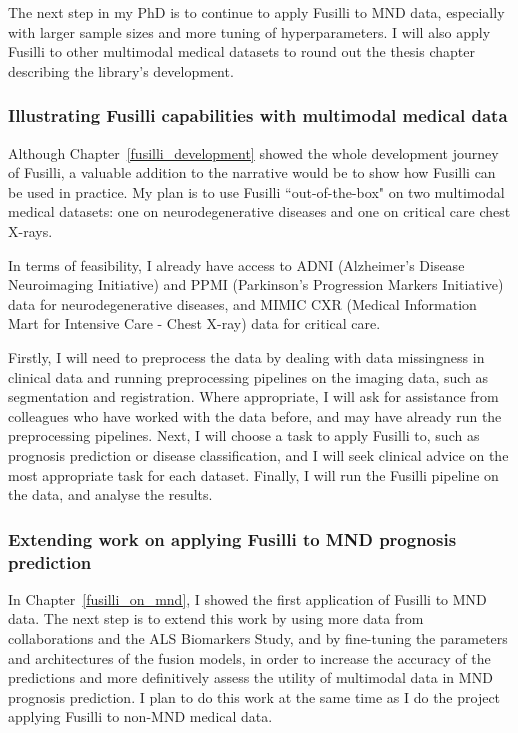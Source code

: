 The next step in my PhD is to continue to apply Fusilli to MND data, especially with larger sample sizes and more tuning of hyperparameters.
I will also apply Fusilli to other multimodal medical datasets to round out the thesis chapter describing the library's development.

\subsubsection*{Illustrating Fusilli capabilities with multimodal medical data}

Although Chapter~\ref{fusilli_development} showed the whole development journey of Fusilli, a valuable addition to the narrative would be to show how Fusilli can be used in practice.
My plan is to use Fusilli ``out-of-the-box" on two multimodal medical datasets: one on neurodegenerative diseases and one on critical care chest X-rays.

In terms of feasibility, I already have access to ADNI (Alzheimer's Disease Neuroimaging Initiative) and PPMI (Parkinson's Progression Markers Initiative) data for neurodegenerative diseases, and MIMIC CXR (Medical Information Mart for Intensive Care - Chest X-ray) data for critical care.

Firstly, I will need to preprocess the data by dealing with data missingness in clinical data and running preprocessing pipelines on the imaging data, such as segmentation and registration.
Where appropriate, I will ask for assistance from colleagues who have worked with the data before, and may have already run the preprocessing pipelines.
Next, I will choose a task to apply Fusilli to, such as prognosis prediction or disease classification, and I will seek clinical advice on the most appropriate task for each dataset.
Finally, I will run the Fusilli pipeline on the data, and analyse the results.

\subsubsection*{Extending work on applying Fusilli to MND prognosis prediction}

In Chapter~\ref{fusilli_on_mnd}, I showed the first application of Fusilli to MND data.
The next step is to extend this work by using more data from collaborations and the ALS Biomarkers Study, and by fine-tuning the parameters and architectures of the fusion models, in order to increase the accuracy of the predictions and more definitively assess the utility of multimodal data in MND prognosis prediction.
I plan to do this work at the same time as I do the project applying Fusilli to non-MND medical data.

